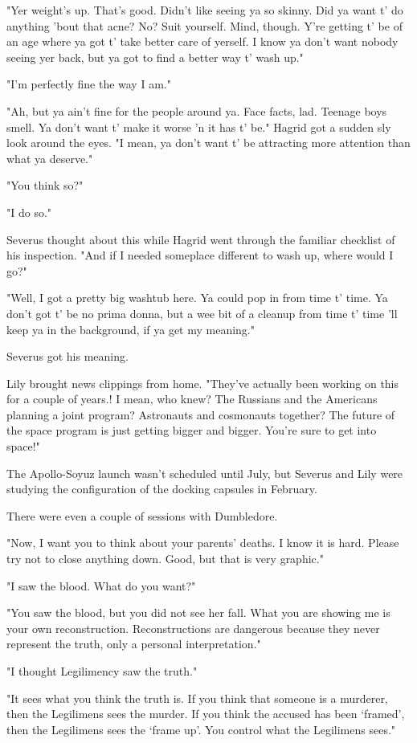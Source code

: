 "Yer weight's up. That's good. Didn't like seeing ya so skinny. Did ya want t' do anything 'bout that acne? No? Suit yourself. Mind, though. Y're getting t' be of an age where ya got t' take better care of yerself. I know ya don't want nobody seeing yer back, but ya got to find a better way t' wash up."

"I'm perfectly fine the way I am."

"Ah, but ya ain't fine for the people around ya. Face facts, lad. Teenage boys smell. Ya don't want t' make it worse 'n it has t' be." Hagrid got a sudden sly look around the eyes. "I mean, ya don't want t' be attracting more attention than what ya deserve."

"You think so?"

"I do so."

Severus thought about this while Hagrid went through the familiar checklist of his inspection. "And if I needed someplace different to wash up, where would I go?"

"Well, I got a pretty big washtub here. Ya could pop in from time t' time. Ya don't got t' be no prima donna, but a wee bit of a cleanup from time t' time 'll keep ya in the background, if ya get my meaning."

Severus got his meaning.

Lily brought news clippings from home. "They've actually been working on this for a couple of years.! I mean, who knew? The Russians and the Americans planning a joint program? Astronauts and cosmonauts together? The future of the space program is just getting bigger and bigger. You're sure to get into space!"

The Apollo-Soyuz launch wasn't scheduled until July, but Severus and Lily were studying the configuration of the docking capsules in February.

There were even a couple of sessions with Dumbledore.

"Now, I want you to think about your parents' deaths. I know it is hard. Please try not to close anything down. Good, but that is very graphic."

"I saw the blood. What do you want?"

"You saw the blood, but you did not see her fall. What you are showing me is your own reconstruction. Reconstructions are dangerous because they never represent the truth, only a personal interpretation."

"I thought Legilimency saw the truth."

"It sees what you think the truth is. If you think that someone is a murderer, then the Legilimens sees the murder. If you think the accused has been `framed', then the Legilimens sees the `frame up'. You control what the Legilimens sees."


